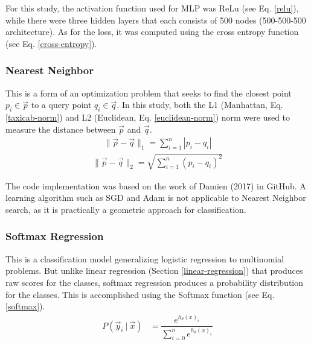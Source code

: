For this study, the activation function used for MLP was ReLu\cite{hahnloser2000digital} (see Eq. \ref{relu}), while there were three hidden layers that each consists of 500 nodes (500-500-500 architecture). As for the loss, it was computed using the cross entropy function (see Eq. \ref{cross-entropy}).

\subsubsection{Nearest Neighbor}
This is a form of an optimization problem that seeks to find the closest point $p_{i} \in \vec{p}$ to a query point $q_{i} \in \vec{q}$. In this study, both the L1 (Manhattan, Eq. \ref{taxicab-norm}) and L2 (Euclidean, Eq. \ref{euclidean-norm}) norm were used to measure the distance between $\vec{p}$ and $\vec{q}$.
\begin{equation}\label{taxicab-norm}
        \begin{gathered}
                \|\vec{p} - \vec{q}\|_{1} = \sum_{i=1}^{n} |p_{i} - q_{i}|
        \end{gathered}
\end{equation}
\begin{equation}\label{euclidean-norm}
        \begin{gathered}
                \|\vec{p} - \vec{q}\|_{2} = \sqrt{\sum_{i=1}^{n} (p_{i} - q_{i})^{2}}
        \end{gathered}
\end{equation}

The code implementation was based on the work of Damien (2017)\cite{aymericdamien} in GitHub. A learning algorithm such as SGD and Adam\cite{Kingma} is not applicable to Nearest Neighbor search, as it is practically a geometric approach for classification.

\subsubsection{Softmax Regression}
This is a classification model generalizing logistic regression to multinomial problems. But unlike linear regression (Section \ref{linear-regression}) that produces raw scores for the classes, softmax regression produces a probability distribution for the classes. This is accomplished using the Softmax function (see Eq. \ref{softmax}).
\begin{align}\label{softmax}
P(\vec{y}_{i}\ |\ \vec{x})	&= \dfrac{e^{h_{\theta}(x)_{i}}}{\sum_{i=0}^{n} e^{h_{\theta}(x)_{i}}}
\end{align}

